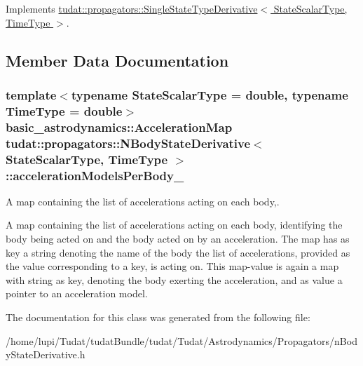 Implements \hyperlink{classtudat_1_1propagators_1_1SingleStateTypeDerivative_a9542fa3986fabe6129f0bf5b788daeba}{tudat\+::propagators\+::\+Single\+State\+Type\+Derivative$<$ State\+Scalar\+Type, Time\+Type $>$}.



\subsection{Member Data Documentation}
\subsubsection[{\texorpdfstring{acceleration\+Models\+Per\+Body\+\_\+}{accelerationModelsPerBody_}}]{\setlength{\rightskip}{0pt plus 5cm}template$<$typename State\+Scalar\+Type  = double, typename Time\+Type  = double$>$ basic\+\_\+astrodynamics\+::\+Acceleration\+Map {\bf tudat\+::propagators\+::\+N\+Body\+State\+Derivative}$<$ State\+Scalar\+Type, Time\+Type $>$\+::acceleration\+Models\+Per\+Body\+\_\+\hspace{0.3cm}{\ttfamily [protected]}}\hypertarget{classtudat_1_1propagators_1_1NBodyStateDerivative_aa9ae6d8dfda131ffca5b23c1564342af}{}\label{classtudat_1_1propagators_1_1NBodyStateDerivative_aa9ae6d8dfda131ffca5b23c1564342af}


A map containing the list of accelerations acting on each body,. 

A map containing the list of accelerations acting on each body, identifying the body being acted on and the body acted on by an acceleration. The map has as key a string denoting the name of the body the list of accelerations, provided as the value corresponding to a key, is acting on. This map-\/value is again a map with string as key, denoting the body exerting the acceleration, and as value a pointer to an acceleration model. 

The documentation for this class was generated from the following file\+:\begin{DoxyCompactItemize}
\item 
/home/lupi/\+Tudat/tudat\+Bundle/tudat/\+Tudat/\+Astrodynamics/\+Propagators/n\+Body\+State\+Derivative.\+h\end{DoxyCompactItemize}
